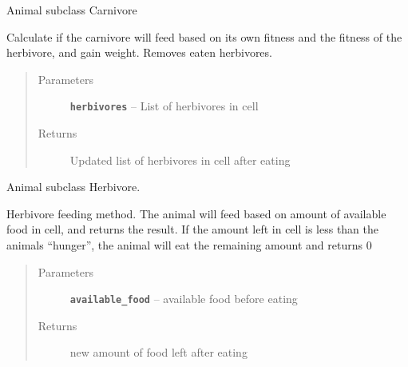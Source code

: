 \documentclass[a4paper,10pt,openany,oneside]{sphinxmanual}
\begin{document}
\begin{fulllineitems}
\label{animals:biosim.animals.Carnivore}
Animal subclass Carnivore

\begin{fulllineitems}
\label{animals:biosim.animals.Carnivore.feeding}
Calculate if the carnivore will feed based on its own fitness and
the fitness of the herbivore, and gain weight. Removes eaten
herbivores.
\begin{quote}\begin{description}
\item[{Parameters}] \leavevmode
\textbf{\texttt{herbivores}} -- List of herbivores in cell

\item[{Returns}] \leavevmode
Updated list of herbivores in cell after eating

\end{description}\end{quote}

\end{fulllineitems}


\end{fulllineitems}


\begin{fulllineitems}
\label{animals:biosim.animals.Herbivore}
Animal subclass Herbivore.

\begin{fulllineitems}
\label{animals:biosim.animals.Herbivore.feeding}
Herbivore feeding method. The animal will feed based on amount of
available food in cell, and returns the result. If the amount left in
cell is less than the animals ``hunger'', the animal will eat the
remaining amount and returns 0
\begin{quote}\begin{description}
\item[{Parameters}] \leavevmode
\textbf{\texttt{available\_food}} -- available food before eating

\item[{Returns}] \leavevmode
new amount of food left after eating

\end{description}\end{quote}

\end{fulllineitems}


\end{fulllineitems}
\end{document}
